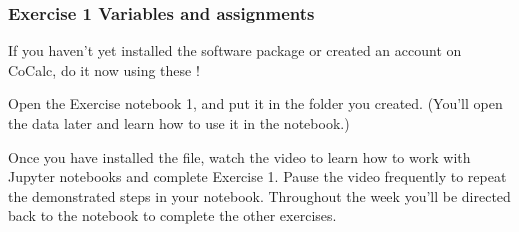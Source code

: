 \documentclass[letterpaper,10pt,english]{sphinxmanual}
\begin{document}
\subsubsection{Exercise 1 Variables and assignments}
\label{\detokenize{content/session_01/Part_01_02:Exercise-1-Variables-and-assignments}}
If you haven’t yet installed the software package or created an account on CoCalc, do it now using these !

Open the Exercise notebook 1, and put it in the folder you created. (You’ll open the data later and learn how to use it in the notebook.)

Once you have installed the file, watch the video to learn how to work with Jupyter notebooks and complete Exercise 1. Pause the video frequently to repeat the demonstrated steps in your notebook. Throughout the week you’ll be directed back to the notebook to complete the other exercises.
\end{document}
